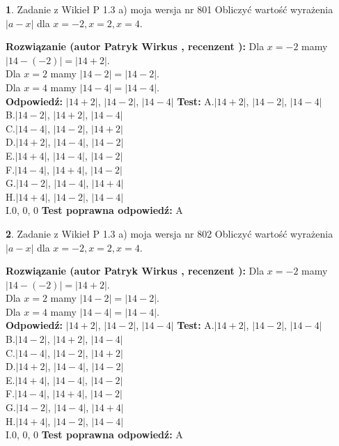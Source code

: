 \documentclass[12pt, a4paper]{article}
\theoremstyle{definition} %
\newtheorem{zad}{}
\newcommand{\zadStart}[1]{\begin{zad}#1\newline}
\newcommand{\zadStop}{\end{zad}}
\newcommand{\rozwStart}[2]{\noindent \textbf{Rozwiązanie (autor #1 , recenzent #2): }\newline}
\newcommand{\rozwStop}{\newline}
\newcommand{\odpStart}{\noindent \textbf{Odpowiedź:}\newline}
\newcommand{\odpStop}{\newline}
\newcommand{\testStart}{\noindent \textbf{Test:}\newline}
\newcommand{\testStop}{\newline}
\newcommand{\kluczStart}{\noindent \textbf{Test poprawna odpowiedź:}\newline}
\newcommand{\kluczStop}{\newline}
\begin{document}
\zadStart{Zadanie z Wikieł P 1.3 a) moja wersja nr 801}
Obliczyć wartość wyrażenia $|a - x|$ dla $x=-2,x=2,x=4$.
\zadStop
\rozwStart{Patryk Wirkus}{}
Dla $x = -2$ mamy $|14 - (-2)| = |14 + 2|$.\\
Dla $x = 2$ mamy $|14 - 2| = |14 - 2|$.\\
Dla $x = 4$ mamy $|14 - 4| = |14 - 4|$.\\
\rozwStop
\odpStart
$|14 + 2|$, $|14 - 2|$, $|14 - 4|$
\odpStop
\testStart
A.$|14 + 2|$, $|14 - 2|$, $|14 - 4|$\\
B.$|14 - 2|$, $|14 + 2|$, $|14 - 4|$\\
C.$|14 - 4|$, $|14 - 2|$, $|14 + 2|$\\
D.$|14 + 2|$, $|14 - 4|$, $|14 - 2|$\\
E.$|14 + 4|$, $|14 - 4|$, $|14 - 2|$\\
F.$|14 - 4|$, $|14 + 4|$, $|14 - 2|$\\
G.$|14 - 2|$, $|14 - 4|$, $|14 + 4|$\\
H.$|14 + 4|$, $|14 - 2|$, $|14 - 4|$\\
I.$0$, $0$, $0$
\testStop
\kluczStart
A
\kluczStop



\zadStart{Zadanie z Wikieł P 1.3 a) moja wersja nr 802}
Obliczyć wartość wyrażenia $|a - x|$ dla $x=-2,x=2,x=4$.
\zadStop
\rozwStart{Patryk Wirkus}{}
Dla $x = -2$ mamy $|14 - (-2)| = |14 + 2|$.\\
Dla $x = 2$ mamy $|14 - 2| = |14 - 2|$.\\
Dla $x = 4$ mamy $|14 - 4| = |14 - 4|$.\\
\rozwStop
\odpStart
$|14 + 2|$, $|14 - 2|$, $|14 - 4|$
\odpStop
\testStart
A.$|14 + 2|$, $|14 - 2|$, $|14 - 4|$\\
B.$|14 - 2|$, $|14 + 2|$, $|14 - 4|$\\
C.$|14 - 4|$, $|14 - 2|$, $|14 + 2|$\\
D.$|14 + 2|$, $|14 - 4|$, $|14 - 2|$\\
E.$|14 + 4|$, $|14 - 4|$, $|14 - 2|$\\
F.$|14 - 4|$, $|14 + 4|$, $|14 - 2|$\\
G.$|14 - 2|$, $|14 - 4|$, $|14 + 4|$\\
H.$|14 + 4|$, $|14 - 2|$, $|14 - 4|$\\
I.$0$, $0$, $0$
\testStop
\kluczStart
A
\kluczStop
\end{document}
